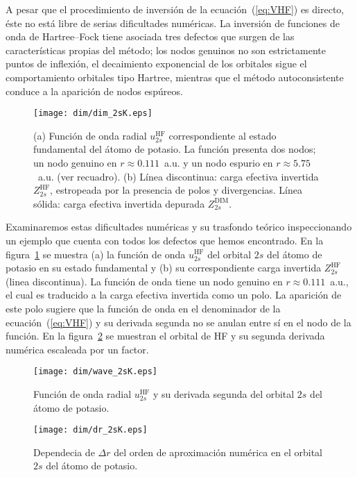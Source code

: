 A pesar que el procedimiento de inversión de la ecuación~(\ref{eq:VHF}) 
es directo, éste no está libre de serias dificultades numéricas. 
La inversión de funciones de onda de Hartree--Fock tiene asociada tres
defectos que surgen de las características propias del método; los nodos 
genuinos no son estrictamente puntos de inflexión, el decaimiento 
exponencial de los orbitales sigue el comportamiento orbitales tipo 
Hartree, mientras que el método autoconsistente conduce a la aparición 
de nodos espúreos. 

\begin{figure}[t]
\centering
\texttt{[image: dim/dim\_2sK.eps]} 
\caption[Función de onda radial y carga efectiva correspondiente.]
{(a) Función de onda radial $u_{2s}^{\mathrm{HF}}$ 
correspondiente al estado fundamental del átomo de potasio.
La función presenta dos nodos; un nodo genuino en $r \approx 0.111$~a.u. 
y un nodo espurio en $r\approx 5.75$~a.u. (ver recuadro). 
(b) Línea discontinua: carga efectiva invertida $Z_{2s}^{\mathrm{HF}}$, 
estropeada por la presencia de polos y divergencias.
Línea sólida: carga efectiva invertida depurada $Z_{2s}^{\mathrm{DIM}}$.}
\label{fig:2sK}
\end{figure}

Examinaremos estas dificultades numéricas y su trasfondo teórico 
inspeccionando un ejemplo que cuenta con todos los defectos que hemos 
encontrado. En la figura~\ref{fig:2sK} se muestra (a) la función de 
onda $u_{2s}^{\mathrm{HF}}$ del orbital $2s$ del átomo de potasio en su 
estado fundamental y (b) su correspondiente carga invertida 
$Z_{2s}^{\mathrm{HF}}$ (linea discontinua). La función de onda tiene un 
nodo genuino en $r\approx 0.111$~a.u., el cual es traducido a la carga 
efectiva invertida como un polo. La aparición de este polo sugiere que 
la función de onda en el denominador de la ecuación~(\ref{eq:VHF}) y su 
derivada segunda no se anulan entre sí en el nodo de la función. En la 
figura~\ref{fig:wave2sK} se muestran el orbital de HF y su segunda 
derivada numérica escaleada por un factor. 


\begin{figure}
\centering
\texttt{[image: dim/wave\_2sK.eps]} 
\caption[Función de onda radial y su derivada segunda de K.]
{Función de onda radial $u_{2s}^{\mathrm{HF}}$ y su derivada segunda 
del orbital $2s$ del átomo de potasio.}
\label{fig:wave2sK}
\end{figure}


\begin{figure}
\centering
\texttt{[image: dim/dr\_2sK.eps]} 
\caption[Dependecia de $\Delta r$ del orden de aproximación numérica.]
{Dependecia de $\Delta r$ del orden de aproximación numérica en el 
orbital $2s$ del átomo de potasio.}
\label{fig:dr2sK}
\end{figure}

